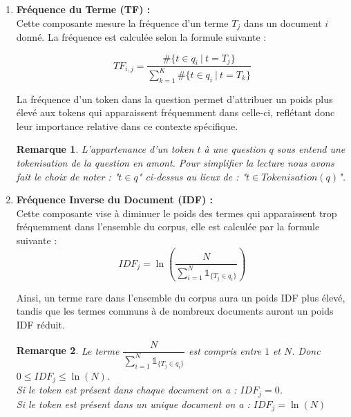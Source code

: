 \documentclass[12pt]{article}
\newtheorem{rmq}{Remarque}
\theoremstyle{definition}
\begin{document}
	\begin{enumerate}
		\item \textbf{Fréquence du Terme (TF) :}\\
		
		Cette composante mesure la fréquence d'un terme $T_j$ dans un document $i$ donné. La fréquence est calculée selon la formule suivante : 
		
		$$  TF_{i,j} = \dfrac{\#\{t\in q_i ~|~ t = T_j\}}{\displaystyle\sum_{k=1}^{K}\#\{t\in q_i ~|~ t = T_k\}}$$
		
		

		La fréquence d'un token dans la question permet d'attribuer un poids plus élevé aux tokens qui apparaissent fréquemment dans celle-ci, reflétant donc leur importance relative dans ce contexte spécifique.\\
		
		\begin{rmq}
		L'appartenance d'un token $t$ à une question $q$ sous entend une tokenisation de la question en amont. Pour simplifier la lecture nous avons fait le choix de noter : "$t\in q$" ci-dessus au lieux de : "$t\in Tokenisation(q)$". \\ 
		\end{rmq}
		
		
		\item \textbf{Fréquence Inverse du Document (IDF) :} \\
		
		Cette composante vise à diminuer le poids des termes qui apparaissent trop fréquemment dans l'ensemble du corpus, elle est calculée par la formule suivante :
		$$  IDF_{j} = \ln\left(\dfrac{N}{\sum_{i=1}^{N}\mathbb{1}_{\{T_j \in q_i\}}}\right)$$ 
		
		Ainsi, un terme rare dans l'ensemble du corpus aura un poids IDF plus élevé, tandis que les termes communs à de nombreux documents auront un poids IDF réduit.\\

		\begin{rmq}
			Le terme $\dfrac{N}{\sum_{i=1}^{N}\mathbb{1}_{\{T_j \in q_i\}}}$ est compris entre $1$ et $N$. Donc $0\leq IDF_{j} \leq \ln(N)$.\\
			
			Si le token est présent dans chaque document on a : $IDF_{j} = 0$.\\
			Si le token est présent dans un unique document on a : $IDF_{j} = \ln(N)$  
		\end{rmq}
		
	\end{enumerate}
	
\end{document}
